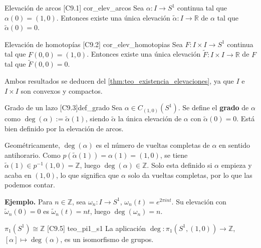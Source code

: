 \begin{proposicion}{Elevación de arcos [C9.1] \marcaC}{cor_elev_arcos}
Sea $\alpha \colon I \to S^1$ continua tal que $\alpha(0) = (1,0)$. Entonces existe una única elevación $\tilde{\alpha} \colon I \to \mathbb{R}$ de $\alpha$ tal que $\tilde{\alpha}(0) = 0$.
\end{proposicion}

\begin{proposicion}{Elevación de homotopías [C9.2] \marcaC}{cor_elev_homotopias}
Sea $F \colon I \times I \to S^1$ continua tal que $F(0,0) = (1,0)$. Entonces existe una única elevación $\tilde{F} \colon I \times I \to \mathbb{R}$ de $F$ tal que $\tilde{F}(0,0) = 0$.
\end{proposicion}

Ambos resultados se deducen del \cref{thm:teo_existencia_elevaciones}, ya que $I$ e $I \times I$ son convexos y compactos.

\begin{definicion}{Grado de un lazo [C9.3]}{def_grado}
Sea $\alpha \in C_{(1,0)}(S^1)$. Se define el \textbf{grado} de $\alpha$ como $\deg(\alpha) := \tilde{\alpha}(1)$, siendo $\tilde{\alpha}$ la única elevación de $\alpha$ con $\tilde{\alpha}(0) = 0$. Está bien definido por la elevación de arcos.
\end{definicion}

Geométricamente, $\deg(\alpha)$ es el número de vueltas completas de $\alpha$ en sentido antihorario. Como $p(\tilde{\alpha}(1)) = \alpha(1) = (1,0)$, se tiene $\tilde{\alpha}(1) \in p^{-1}(1,0) = \mathbb{Z}$, luego $\deg(\alpha) \in \mathbb{Z}$.
Solo esta definido si $\alpha$ empieza y acaba en $(1,0)$, lo que significa que $\alpha$ solo da vueltas completas, por lo que las podemos contar.

\textbf{Ejemplo.} Para $n \in \mathbb{Z}$, sea $\omega_n \colon I \to S^1$, $\omega_n(t) = e^{2\pi i n t}$. Su elevación con $\tilde{\omega}_n(0)=0$ es $\tilde{\omega}_n(t) = nt$, luego $\deg(\omega_n) = n$.

\begin{teorema}{$\pi_1(S^1)\cong \mathbb{Z}$ [C9.5] \marcaT}{teo_pi1_s1}
La aplicación $\deg \colon \pi_1(S^1,(1,0)) \to \mathbb{Z}$, $[\alpha] \mapsto \deg(\alpha)$, es un isomorfismo de grupos.
\end{teorema}


